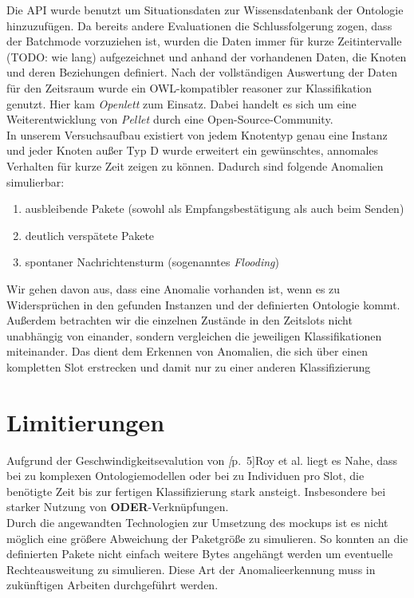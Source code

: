 Die API wurde benutzt um Situationsdaten zur Wissensdatenbank der Ontologie hinzuzufügen. Da bereits andere Evaluationen die Schlussfolgerung zogen, dass der Batchmode vorzuziehen ist, wurden die Daten immer für kurze Zeitintervalle (TODO: wie lang) aufgezeichnet und anhand der vorhandenen Daten, die Knoten und deren Beziehungen definiert. Nach der vollständigen Auswertung der Daten für den Zeitsraum wurde ein OWL-kompatibler \Gls{reasoner} zur Klassifikation genutzt. Hier kam \textit{Openlett}\cite{openlett} zum Einsatz. Dabei handelt es sich um eine Weiterentwicklung von \textit{Pellet}\cite{pellet} durch eine Open-Source-Community.\\
In unserem Versuchsaufbau existiert von jedem Knotentyp genau eine Instanz und jeder Knoten außer Typ D wurde erweitert ein gewünschtes, annomales Verhalten für kurze Zeit zeigen zu können. Dadurch sind folgende Anomalien simulierbar:
\begin{enumerate}
\item ausbleibende Pakete (sowohl als Empfangsbestätigung als auch beim Senden)
\item deutlich verspätete Pakete
\item spontaner Nachrichtensturm (sogenanntes \textit{Flooding})
\end{enumerate}
Wir gehen davon aus, dass eine Anomalie vorhanden ist, wenn es zu Widersprüchen in den gefunden Instanzen und der definierten Ontologie kommt. Außerdem betrachten wir die einzelnen Zustände in den Zeitslots nicht unabhängig von einander, sondern vergleichen die jeweiligen Klassifikationen miteinander. Das dient dem Erkennen von Anomalien, die sich über einen kompletten Slot erstrecken und damit nur zu einer anderen Klassifizierung 

\section{Limitierungen}
Aufgrund der Geschwindigkeitsevalution von \textit[p.~5]{Roy et al.}\cite{roy2010exploitation} liegt es Nahe, dass bei zu komplexen Ontologiemodellen oder bei zu Individuen pro Slot, die benötigte Zeit bis zur fertigen Klassifizierung stark ansteigt. Insbesondere bei starker Nutzung von \textbf{ODER}-Verknüpfungen.\\
Durch die angewandten Technologien zur Umsetzung des \Gls{mockup}s ist es nicht möglich eine größere Abweichung der Paketgröße zu simulieren. So konnten an die definierten Pakete nicht einfach weitere Bytes angehängt werden um eventuelle Rechteausweitung zu simulieren. Diese Art der Anomalieerkennung muss in zukünftigen Arbeiten durchgeführt werden.